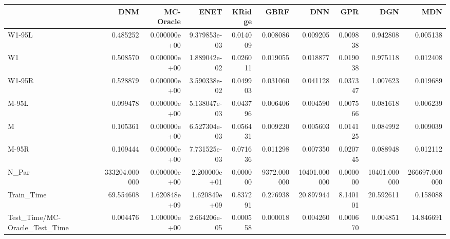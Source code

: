 \begin{tabular}{lrrrrrrrrr}
\toprule
{} &            DNM &     MC-Oracle &          ENET &    KRidge &         GBRF &           DNN &       GPR &           DGN &            MDN \\
\midrule
W1-95L                        &       0.485252 &  0.000000e+00 &  9.379853e-03 &  0.014009 &     0.008086 &      0.009205 &  0.009838 &      0.942808 &       0.005138 \\
W1                            &       0.508570 &  0.000000e+00 &  1.889042e-02 &  0.026011 &     0.019055 &      0.018877 &  0.019038 &      0.975118 &       0.012408 \\
W1-95R                        &       0.528879 &  0.000000e+00 &  3.590338e-02 &  0.049903 &     0.031060 &      0.041128 &  0.037347 &      1.007623 &       0.019689 \\
M-95L                         &       0.099478 &  0.000000e+00 &  5.138047e-03 &  0.043796 &     0.006406 &      0.004590 &  0.007566 &      0.081618 &       0.006239 \\
M                             &       0.105361 &  0.000000e+00 &  6.527304e-03 &  0.056431 &     0.009220 &      0.005603 &  0.014125 &      0.084992 &       0.009039 \\
M-95R                         &       0.109444 &  0.000000e+00 &  7.731525e-03 &  0.071636 &     0.011298 &      0.007350 &  0.020745 &      0.088948 &       0.012112 \\
N\_Par                         &  333204.000000 &  0.000000e+00 &  2.200000e+01 &  0.000000 &  9372.000000 &  10401.000000 &  0.000000 &  10401.000000 &  266697.000000 \\
Train\_Time                    &      69.554608 &  1.620848e+09 &  1.620849e+09 &  0.837291 &     0.276938 &     20.897944 &  8.140101 &     20.592611 &       0.158088 \\
Test\_Time/MC-Oracle\_Test\_Time &       0.004476 &  1.000000e+00 &  2.664206e-05 &  0.000558 &     0.000018 &      0.004260 &  0.000670 &      0.004851 &      14.846691 \\
\bottomrule
\end{tabular}
